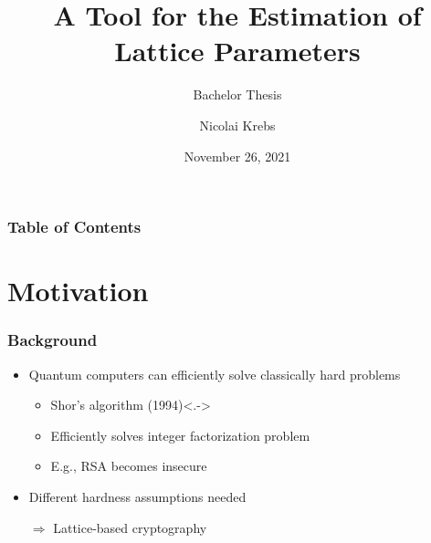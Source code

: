 \documentclass[t, aspectratio=169]{beamer}
\title[Lattice Parameter Estimation]{A Tool for the Estimation of Lattice Parameters}
\subtitle{Bachelor Thesis}
\author{Nicolai Krebs}
\date{November 26, 2021}
\begin{document}
\frame{\titlepage}
\begin{frame}
    \frametitle{Table of Contents}
    \tableofcontents
\end{frame}

\section{Motivation}
\begin{frame}
    \frametitle{Background}
    \begin{itemize}[<+->]
        \item Quantum computers can efficiently solve classically hard problems
              \begin{itemize}
                  \item Shor's algorithm (1994)\only<.->{}
                  \item Efficiently solves integer factorization problem %
                  \item E.g., RSA becomes insecure
              \end{itemize}
        \item Different hardness assumptions needed
        \item[$\Rightarrow$] Lattice-based cryptography
    \end{itemize}
\end{frame}
\end{document}
